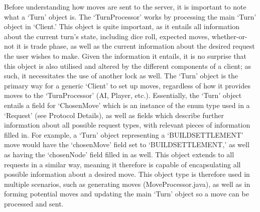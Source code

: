 \documentclass[a4paper,doc,draftfirst]{apa6}
\begin{document}
Before understanding how moves are sent to the server, it is important to note what a ‘Turn’ object is. The ‘TurnProcessor’ works by processing the main ‘Turn’ object in ‘Client.’ This object is quite important, as it entails all information about the current turn’s state, including dice roll, expected moves, whether-or-not it is trade phase, as well as the current information about the desired request the user wishes to make. Given the information it entails, it is no surprise that this object is also utilised and altered by the different components of a client; as such, it necessitates the use of another lock as well. The ‘Turn’ object is the primary way for a generic ‘Client’ to set up moves, regardless of how it provides moves to the ‘TurnProcessor’ (AI, Player, etc.). Essentially, the ‘Turn’ object entails a field for ‘ChosenMove’ which is an instance of the enum type used in a ‘Request’ (see Protocol Details), as well as fields which describe further information about all possible request types, with relevant pieces of information filled in. For example, a ‘Turn’ object representing a ‘BUILDSETTLEMENT’ move would have the ‘chosenMove’ field set to ‘BUILDSETTLEMENT,’ as well as having the ‘chosenNode’ field filled in as well. This object extends to all requests in a similar way, meaning it therefore is capable of encapsulating all possible information about a desired move. This object type is therefore used in multiple scenarios, such as generating moves (MoveProcessor.java), as well as in forming potential moves and updating the main ‘Turn’ object so a move can be processed and sent.
\end{document}
